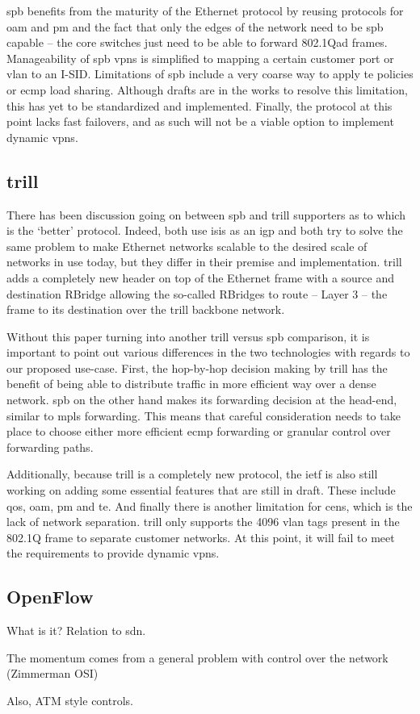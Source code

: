 \ac{spb} benefits from the maturity of the Ethernet protocol by reusing protocols for \ac{oam} and \ac{pm} and the fact that only the edges of the network need to be \ac{spb} capable -- the core switches just need to be able to forward 802.1Qad frames. Manageability of \ac{spb} \acp{vpn} is simplified to mapping a certain customer port or \ac{vlan} to an I-SID. Limitations of \ac{spb} include a very coarse way to apply \ac{te} policies or \ac{ecmp} load sharing. Although drafts are in the works to resolve this limitation, this has yet to be standardized and implemented. Finally, the protocol at this point lacks fast failovers, and as such will not be a viable option to implement dynamic \acp{vpn}.



\subsection{\acs{trill}} %
\label{sub:trill}
There has been discussion going on between \ac{spb} and \ac{trill} supporters as to which is the `better' protocol. Indeed, both use \ac{isis} as an \ac{igp} and both try to solve the same problem to make Ethernet networks scalable to the desired scale of networks in use today, but they differ in their premise and implementation. \ac{trill} adds a completely new header on top of  the Ethernet frame with a source and destination RBridge allowing the so-called RBridges to route -- Layer 3 -- the frame to its destination over the \ac{trill} backbone network.

Without this paper turning into another \ac{trill} versus \ac{spb} comparison, it is important to point out various differences in the two technologies with regards to our proposed use-case. First, the hop-by-hop decision making by \ac{trill} has the benefit of being able to distribute traffic in more efficient way over a dense network. \ac{spb} on the other hand makes its forwarding decision at the head-end, similar to \ac{mpls} forwarding. This means that careful consideration needs to take place to choose either more efficient \ac{ecmp} forwarding or granular control over forwarding paths. 

Additionally, because \ac{trill} is a completely new protocol, the \ac{ietf} is also still working on adding some essential features that are still in draft. These include \ac{qos}, \ac{oam}, \ac{pm} and \ac{te}. And finally there is another limitation for \acp{cen}, which is the lack of network separation. \ac{trill} only supports the 4096 \ac{vlan} tags present in the 802.1Q frame to separate customer networks. At this point, it will fail to meet the requirements to provide dynamic \acp{vpn}.






\subsection{OpenFlow} %
\label{sub:openflow}
What is it? Relation to \ac{sdn}.

The momentum comes from a general problem with control over the network (Zimmerman OSI)

Also, ATM style controls.




